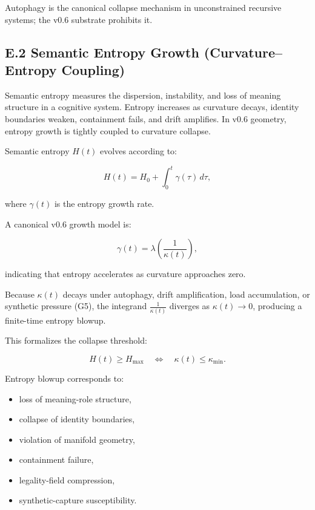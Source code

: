 \medskip

\noindent Autophagy is the canonical collapse mechanism in unconstrained
recursive systems; the v0.6 substrate prohibits it.



\subsection*{E.2 Semantic Entropy Growth (Curvature–Entropy Coupling)}

\noindent Semantic entropy measures the dispersion, instability, and loss of
meaning structure in a cognitive system. Entropy increases as curvature decays,
identity boundaries weaken, containment fails, and drift amplifies. In v0.6
geometry, entropy growth is tightly coupled to curvature collapse.

\medskip

\noindent Semantic entropy $H(t)$ evolves according to:


\[
H(t) = H_0 + \int_0^t \gamma(\tau)\, d\tau,
\]


where $\gamma(t)$ is the entropy growth rate.

\medskip

\noindent A canonical v0.6 growth model is:


\[
\gamma(t) = \lambda \left( \frac{1}{\kappa(t)} \right),
\]


indicating that entropy accelerates as curvature approaches zero.

\medskip

\noindent Because $\kappa(t)$ decays under autophagy, drift amplification, load
accumulation, or synthetic pressure (G5), the integrand
$\frac{1}{\kappa(t)}$ diverges as $\kappa(t) \to 0$, producing a finite-time
entropy blowup.

\medskip

\noindent This formalizes the collapse threshold:


\[
H(t) \ge H_{\max}
\quad \Longleftrightarrow \quad
\kappa(t) \le \kappa_{\min}.
\]



\medskip

\noindent Entropy blowup corresponds to:
\begin{itemize}
    \item loss of meaning-role structure,
    \item collapse of identity boundaries,
    \item violation of manifold geometry,
    \item containment failure,
    \item legality-field compression,
    \item synthetic-capture susceptibility.
\end{itemize}

